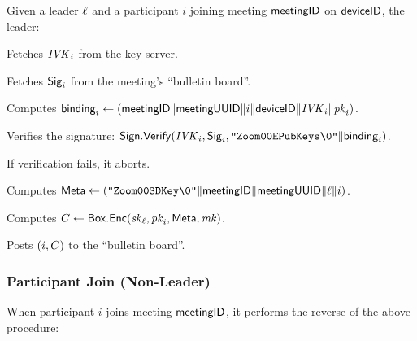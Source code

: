 Given a leader $\ell$ and a participant $i$ joining meeting ${\sf meetingID}$ on ${\sf deviceID}$, the leader:

\begingroup
\RaggedRight
\begin{enumerate*}
\item Fetches $\mathit{IVK}_i$ from the key server.
\item Fetches ${\sf Sig}_i$ from the meeting's ``bulletin board''.
\item Computes ${\sf binding}_i \leftarrow \left( {\sf meetingID} \| \allowbreak {\sf meetingUUID} \| i \allowbreak \| {\sf deviceID} \| \mathit{IVK}_i \| \allowbreak \mathit{pk}_i \right)$.
\item Verifies the signature: ${\sf Sign}.\mathsf{Verify}(\mathit{IVK}_i, {\sf Sig}_i, \allowbreak \texttt{"Zoom00EPubKeys\textbackslash0"} \| \allowbreak {\sf binding}_i)$.
\item If verification fails, it aborts.
\item Computes ${\sf Meta} \leftarrow \left( \texttt{"Zoom00SDKey\textbackslash0"}  \| {\sf meetingID} \| \allowbreak {\sf meetingUUID} \| \allowbreak \ell \| i \right)$.
\item Computes $C \leftarrow {\sf Box}.\mathsf{Enc}(\mathit{sk}_\ell, \mathit{pk}_i, {\sf Meta}, \mathit{mk})$.
   \label{participantJoinRekeyStart}
\item Posts $(i, C)$ to the ``bulletin board''.
   \label{participantJoinRekeyEnd}
\end{enumerate*}
\endgroup

\subsubsection{Participant Join (Non-Leader)}

When participant $i$ joins meeting ${\sf meetingID}$, it performs the reverse of the above procedure:


